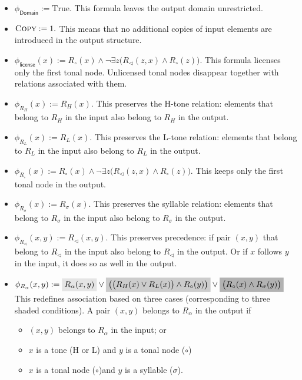 \begin{itemize}
    

\item \(
\phi_{\textsf{Domain}} := \text{True}.
\)
This formula leaves the output domain unrestricted.

\item \(
\textsc{Copy} := 1.
\)
This means that no additional copies of input elements are introduced in the output structure.
\item 
\(
\phi_{\textsf{license}}(x) :=
R_\circ(x) \wedge
\neg \exists z \bigl(R_\lhd(z,x) \wedge R_\circ(z)\bigr).
\)
This formula licenses only the first tonal node. Unlicensed tonal nodes disappear together with relations associated with them.

\item \(
\phi_{R_H}(x) := R_H(x).
\)
This preserves the H-tone relation: elements that belong to $R_H$ in the input
also belong to $R_H$ in the output.

\item \(
\phi_{R_L}(x) := R_L(x).
\)
This preserves the L-tone relation: elements that belong to $R_L$ in the input
also belong to $R_L$ in the output.

\item \(
\phi_{R_\circ}(x) :=
R_\circ(x) \wedge
\neg \exists z \bigl(R_\lhd(z,x) \wedge R_\circ(z)\bigr).
\)
This keeps only the first tonal node in the output. 

\item \(
\phi_{R_\sigma}(x) := R_\sigma(x).
\)
This preserves the syllable relation: elements that belong to $R_\sigma$ in the
input also belong to $R_\sigma$ in the output. 

\item \(
\phi_{R_\lhd}(x,y) := R_\lhd(x,y).
\)
This preserves precedence: if pair $(x,y)$ that belong to $R_\lhd$ in the input
also belong to $R_\lhd$ in the output. Or if \(x\) follows \(y\) in the input, it does so as well in the output.

\item \(
\phi_{R_\alpha}(x,y) :=
\colorbox{gray!20}{$\displaystyle R_\alpha(x,y)$}
\vee
\colorbox{gray!40}{$\displaystyle
\left(
    \bigl(R_H(x) \vee R_L(x)\bigr)
    \wedge R_\circ(y)
\right)
$}
\vee
\colorbox{gray!60}{$\displaystyle
\bigl(
    R_\circ(x)
    \wedge R_\sigma(y)
\bigr)$}
\)
This redefines association based on three cases (corresponding to three shaded conditions). A pair $(x,y)$ belongs to $R_\alpha$ in the output if 
\begin{itemize}
    \item $(x,y)$ belongs to $R_\alpha$ in the input; or
    \item $x$ is a tone (H or L) and $y$ is a tonal node (\(\circ\))
    \item $x$ is a tonal node (\(\circ\))and
$y$ is a syllable  (\(\sigma\)).
\end{itemize}


\end{itemize}
